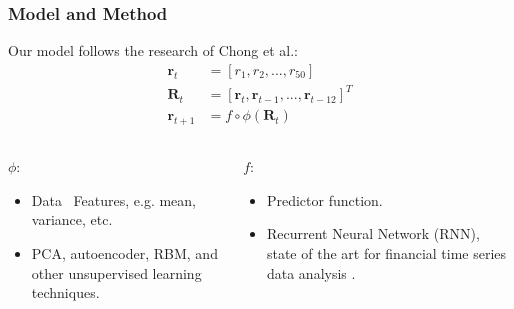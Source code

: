 \documentclass{beamer}
\begin{document}
\begin{frame}
\frametitle{Model and Method}
Our model follows the research of Chong et al.\cite{Chong2017}:
\begin{align*}
\mathbf{r}_{t} & =[r_1,r_2,...,r_{50}] \\
\mathbf{R}_t & = [\mathbf{r}_t,\mathbf{r}_{t-1},...,\mathbf{r}_{t-12}]^T \\
\mathbf{r}_{t+1} & =f\circ\phi(\mathbf{R}_t)
\end{align*}

\begin{columns}
\begin{column}{0.5\textwidth}
\setlength{\partopsep}{0pt}
$\phi$:
\begin{itemize}
	\item Data \textrightarrow\, Features, e.g. mean, variance, etc.
	\item PCA, autoencoder, RBM, and other unsupervised learning techniques.
\end{itemize}
\end{column}
\begin{column}{0.5\textwidth}
\setlength{\partopsep}{0pt}
$f$:
\begin{itemize}
	\item Predictor function.
	\item Recurrent Neural Network (RNN), state of the art for financial time series data analysis \cite{Abe2018}.
\end{itemize}
\end{column}
\end{columns}

\end{frame}
\end{document}
